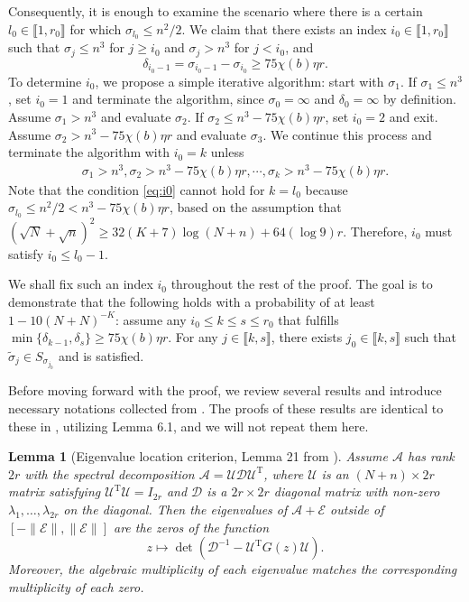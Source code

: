 \documentclass[reqno]{amsart}
\newcommand{\T}{\mathrm{T}}
\theoremstyle{plain}
\newtheorem{lemma}[theorem]{Lemma}
\theoremstyle{definition}
\begin{document}
Consequently, it is enough to examine the scenario where there is a certain $l_0 \in \llbracket 1, r_0\rrbracket$ for which $\sigma_{l_0} \le n^2/2$. We claim that there exists an index $i_0\in \llbracket 1, r_0\rrbracket$ such that $\sigma_j \le  n^3$ for $j\ge i_0$ and $\sigma_j> n^3$ for $j < i_0$, and 
$$\delta_{i_0-1} =\sigma_{i_0-1}- \sigma_{i_0}\ge 75 \chi(b) \eta r.$$
To determine $i_0$, we propose a simple iterative algorithm: start with $\sigma_1$. If $\sigma_1\le n^3$, set $i_0=1$ and terminate the algorithm, since $\sigma_0=\infty$ and $\delta_0=\infty$ by definition. Assume $\sigma_1> n^3$ and evaluate $\sigma_2$. If $\sigma_2 \le n^3 - 75 \chi(b) \eta r$,  set $i_0=2$ and exit. Assume $\sigma_2 > n^3 - 75 \chi(b) \eta r$ and evaluate $\sigma_3$. We continue this process and terminate the algorithm with $i_0=k $ unless 
\begin{align}\label{eq:i0}
\sigma_1> n^3, \sigma_2 > n^3 - 75 \chi(b) \eta r, \cdots, \sigma_k > n^3 - 75 \chi(b) \eta r.
\end{align}
Note that the condition \eqref{eq:i0} cannot hold for $k=l_0$ because $\sigma_{l_0} \le n^2/2 < n^3 - 75 \chi(b) \eta r$, based on the assumption that $(\sqrt N + \sqrt n)^2 \ge 32(K+7)\log(N+n) + 64(\log 9) r$. Therefore, $i_0$ must satisfy $i_0 \le l_0 - 1$.


We shall fix such an index $i_0$  throughout the rest of the proof. The goal is to demonstrate that the following holds with a probability of at least $1-10(N+N)^{-K}$: assume any  $i_0 \le k\le s \le r_0$ that fulfills $\min\{\delta_{k-1},\delta_s \} \ge 75 \chi(b) \eta r$. For any $j \in \llbracket k, s \rrbracket$, there exists $j_0 \in \llbracket k, s \rrbracket$ such that $\widetilde \sigma_j \in S_{\sigma_{j_0}}$ and \cite[Eq. (36)]{Wang24} is satisfied. 
 
Before moving forward with the proof, we review several results and introduce necessary notations collected from \cite{OVW22}. The proofs of these results are identical to these in \cite{OVW22}, utilizing Lemma 6.1, and we will not repeat them here. 
\begin{lemma}[Eigenvalue location criterion, Lemma 21 from \cite{OVW22}]
Assume $\mathcal A$ has rank $2r$ with the spectral decomposition $\mathcal A = \mathcal U \mathcal D \mathcal U^\T$, where $\mathcal U$ is an $(N+n) \times 2r$ matrix satisfying $\mathcal U^\T \mathcal U = I_{2r}$ and $\mathcal D$ is a $2r \times 2r$ diagonal matrix with non-zero $\lambda_1, \ldots, \lambda_{2r}$ on the diagonal.  Then the eigenvalues of $\mathcal A+\mathcal E$ outside of $[ - \|\mathcal E \|, \|\mathcal E\| ]$ are the zeros of the function 
\[ z \mapsto \det (\mathcal D^{-1} - \mathcal U^\T G(z) \mathcal U ). \]
Moreover, the algebraic multiplicity of each eigenvalue matches the corresponding multiplicity of each zero.  
\end{lemma}
\end{document}
